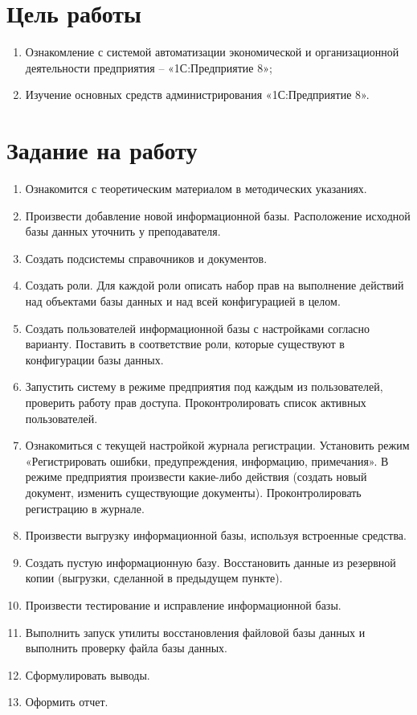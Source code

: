 \documentclass[a4paper,14pt]{extarticle}
\begin{document}


\section{Цель работы}
\begin{enumerate}
    \item Ознакомление с системой автоматизации экономической и организационной
          деятельности предприятия – «1С:Предприятие 8»;
    \item Изучение основных средств администрирования «1С:Предприятие 8».
\end{enumerate}

\section{Задание на работу}
\begin{enumerate}
    \item Ознакомится с теоретическим материалом в методических указаниях.
    \item Произвести добавление новой информационной базы. Расположение исходной
          базы данных уточнить у преподавателя.
    \item Создать подсистемы справочников и документов.
    \item Создать роли. Для каждой роли описать набор прав на выполнение
          действий над объектами базы данных и над всей конфигурацией в целом.
    \item Создать пользователей информационной базы с настройками согласно
          варианту. Поставить в соответствие роли, которые существуют в
          конфигурации базы данных.
    \item Запустить систему в режиме предприятия под каждым из пользователей,
          проверить работу прав доступа. Проконтролировать список активных
          пользователей.
    \item Ознакомиться с текущей настройкой журнала регистрации. Установить
          режим «Регистрировать ошибки, предупреждения, информацию, примечания». В
          режиме предприятия произвести какие-либо действия (создать новый документ,
          изменить существующие документы). Проконтролировать регистрацию в журнале.
    \item Произвести выгрузку информационной базы, используя встроенные средства.
    \item Создать пустую информационную базу. Восстановить данные из резервной
          копии (выгрузки, сделанной в предыдущем пункте).
    \item Произвести тестирование и исправление информационной базы.
    \item Выполнить запуск утилиты восстановления файловой базы данных и
          выполнить проверку файла базы данных.
    \item Сформулировать выводы.
    \item Оформить отчет.
\end{enumerate}
\pagebreak
\end{document}
